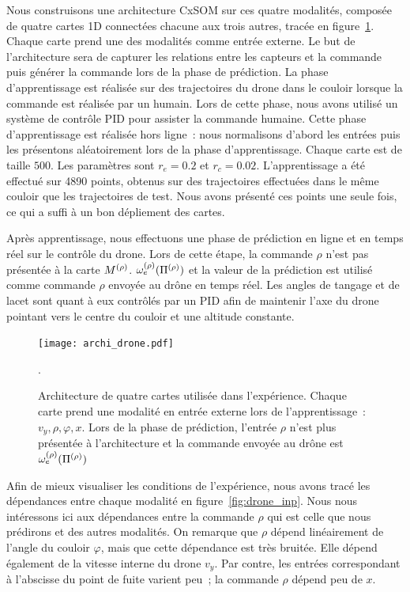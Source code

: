 \documentclass[../main]{subfiles}
\begin{document}
Nous construisons une architecture CxSOM sur ces quatre modalités, composée de quatre cartes 1D connectées chacune aux trois autres, tracée en figure~\ref{fig:archi_drone}. Chaque carte prend une des modalités comme entrée externe.
Le but de l'architecture sera de capturer les relations entre les capteurs et la commande puis générer la commande lors de la phase de prédiction.
La phase d'apprentissage est réalisée sur des trajectoires du drone dans le couloir lorsque la commande est réalisée par un humain.
Lors de cette phase, nous avons utilisé un système de contrôle PID pour assister la commande humaine. 
Cette phase d'apprentissage est réalisée hors ligne~: nous normalisons d'abord les entrées puis les présentons aléatoirement lors de la phase d'apprentissage.
Chaque carte est de taille $500$. Les paramètres sont $r_e = 0.2$ et $r_c = 0.02$.
L'apprentissage a été effectué sur 4890 points, obtenus sur des trajectoires effectuées dans le même couloir que les trajectoires de test. Nous avons présenté ces points une seule fois, ce qui a suffi à un bon dépliement des cartes.


Après apprentissage, nous effectuons une phase de prédiction en ligne et en temps réel sur le contrôle du drone.
Lors de cette étape, la commande $\rho$ n'est pas présentée à la carte $M^{({\rho})}$. $\omega_e^{({\rho})}(\Pi^{({\rho})})$ et la valeur de la prédiction est utilisé comme commande $\rho$ envoyée au drône en temps réel.
Les angles de tangage et de lacet sont quant à eux contrôlés par un PID afin de maintenir l'axe du drone pointant vers le centre du couloir et une altitude constante.

\begin{figure}
	\centering\texttt{[image: archi\_drone.pdf]}
	\caption{Architecture de quatre cartes utilisée dans l'expérience. Chaque carte prend une modalité en entrée externe lors de l'apprentissage~: $v_y,\rho,\varphi,x$. Lors de la phase de prédiction, l'entrée $\rho$ n'est plus présentée à l'architecture et la commande envoyée au drône est $\omega_e^{({\rho})}(\Pi^{({\rho})})$\label{fig:archi_drone}}.
\end{figure}

Afin de mieux visualiser les conditions de l'expérience, nous avons tracé les dépendances entre chaque modalité en figure~\ref{fig:drone_inp}.
Nous nous intéressons ici aux dépendances entre la commande $\rho$ qui est celle que nous prédirons et des autres modalités.
On remarque que $\rho$ dépend linéairement de l'angle du couloir $\varphi$, mais que cette dépendance est très bruitée. Elle dépend également de la vitesse interne du drone $v_y$. Par contre, les entrées correspondant à l'abscisse du point de fuite varient peu~; la commande $\rho$ dépend peu de $x$.
\end{document}
